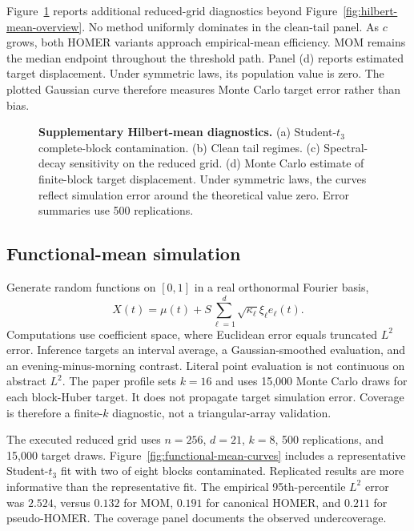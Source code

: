 \documentclass[twoside]{article}
\theoremstyle{definition}
\begin{document}
Figure~\ref{fig:hilbert-mean-supplement} reports additional reduced-grid diagnostics beyond Figure~\ref{fig:hilbert-mean-overview}. No method uniformly dominates in the clean-tail panel. As $c$ grows, both HOMER variants approach empirical-mean efficiency. MOM remains the median endpoint throughout the threshold path. Panel (d) reports estimated target displacement. Under symmetric laws, its population value is zero. The plotted Gaussian curve therefore measures Monte Carlo target error rather than bias.

\begin{figure}[t]
\centering
\resizebox{\textwidth}{!}{}
\caption{\textbf{Supplementary Hilbert-mean diagnostics.}
(a) Student-$t_3$ complete-block contamination. (b) Clean tail regimes. (c) Spectral-decay sensitivity on the reduced grid. (d) Monte Carlo estimate of finite-block target displacement. Under symmetric laws, the curves reflect simulation error around the theoretical value zero. Error summaries use 500 replications.}
\label{fig:hilbert-mean-supplement}
\end{figure}

\subsection{Functional-mean simulation}

Generate random functions on $[0,1]$ in a real orthonormal Fourier basis,
\[
    X(t)=\mu(t)+S\sum_{\ell=1}^{d}\sqrt{\kappa_\ell}\xi_\ell e_\ell(t).
\]
Computations use coefficient space, where Euclidean error equals truncated $L^2$ error. Inference targets an interval average, a Gaussian-smoothed evaluation, and an evening-minus-morning contrast. Literal point evaluation is not continuous on abstract $L^2$. The paper profile sets $k=16$ and uses 15,000 Monte Carlo draws for each block-Huber target. It does not propagate target simulation error. Coverage is therefore a finite-$k$ diagnostic, not a triangular-array validation.

The executed reduced grid uses $n=256$, $d=21$, $k=8$, 500 replications, and 15,000 target draws. Figure~\ref{fig:functional-mean-curves} includes a representative Student-$t_3$ fit with two of eight blocks contaminated. Replicated results are more informative than the representative fit. The empirical 95th-percentile $L^2$ error was $2.524$, versus $0.132$ for MOM, $0.191$ for canonical HOMER, and $0.211$ for pseudo-HOMER. The coverage panel documents the observed undercoverage.
\end{document}
